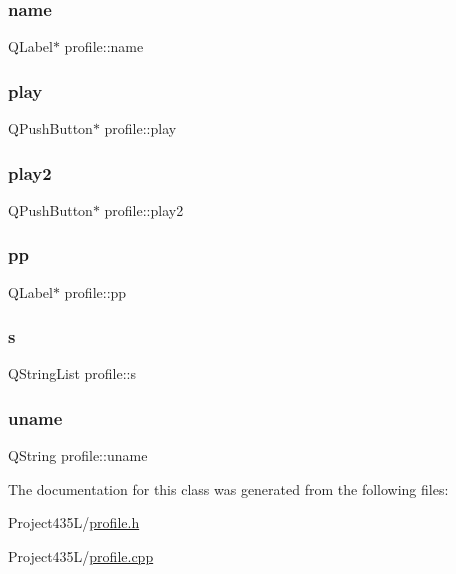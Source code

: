 \subsubsection{\texorpdfstring{name}{name}}
{\footnotesize\ttfamily Q\+Label$\ast$ profile\+::name}

\mbox{\label{classprofile_a77ad898c8cc12bc50a9ef0815bc696e1}} 
\subsubsection{\texorpdfstring{play}{play}}
{\footnotesize\ttfamily Q\+Push\+Button$\ast$ profile\+::play}

\mbox{\label{classprofile_adbad489bbd85e8a12240a891302d99ac}} 
\subsubsection{\texorpdfstring{play2}{play2}}
{\footnotesize\ttfamily Q\+Push\+Button$\ast$ profile\+::play2}

\mbox{\label{classprofile_a92d0c4e4d12fbef61bf63384ad047744}} 
\subsubsection{\texorpdfstring{pp}{pp}}
{\footnotesize\ttfamily Q\+Label$\ast$ profile\+::pp}

\mbox{\label{classprofile_a9ce924e0fad9e3dd191c4020a1db0230}} 
\subsubsection{\texorpdfstring{s}{s}}
{\footnotesize\ttfamily Q\+String\+List profile\+::s}

\mbox{\label{classprofile_a321f742e7986c4ab494ac5c30206c1f1}} 
\subsubsection{\texorpdfstring{uname}{uname}}
{\footnotesize\ttfamily Q\+String profile\+::uname}



The documentation for this class was generated from the following files\+:\begin{DoxyCompactItemize}
\item 
Project435\+L/\hyperlink{profile_8h}{profile.\+h}\item 
Project435\+L/\hyperlink{profile_8cpp}{profile.\+cpp}\end{DoxyCompactItemize}
